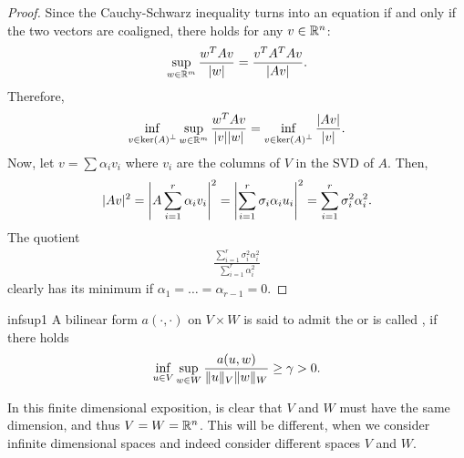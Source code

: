 \begin{proof}
  Since the Cauchy-Schwarz inequality turns into an equation if and
  only if the two vectors are coaligned, there holds for any $v\in \R^n$:
  \begin{gather*}
    \sup_{w\in\R^m}\frac{w^T A v}{\abs{w}} = \frac{v^T A^T A v}{\abs{Av}}.
  \end{gather*}
  Therefore,
  \begin{gather*}
    \inf_{v\in \ortho{\ker A}} \sup_{w\in \R^m}
    \frac{w^T A v}{\abs{v}\abs{w}}
    = \inf_{v\in \ortho{\ker A}} \frac{\abs{Av}}{\abs{v}}.
  \end{gather*}
  Now, let $v = \sum \alpha_i v_i$ where $v_i$ are the columns of $V$
  in the SVD of $A$. Then,
  \begin{gather*}
    \abs{Av}^2 = \abs*{A\sum_{i=1}^r \alpha_i v_i}^2
    = \abs*{\sum_{i=1}^r \sigma_i \alpha_i u_i}^2
    = \sum_{i=1}^r \sigma_i^2 \alpha_i^2.
  \end{gather*}
  The quotient
  \begin{gather*}
    \frac{\sum_{i=1}^r \sigma_i^2 \alpha_i^2}{\sum_{i=1}^r \alpha_i^2}
  \end{gather*}
  clearly has its minimum if $\alpha_1 = \dots=\alpha_{r-1} = 0$.
\end{proof}

\begin{Definition}{infsup1}
  A bilinear form $a(\cdot,\cdot)$ on $V\times W$ is said to admit the
   or is called , if
  there holds
  \begin{gather}
    \label{eq:infsup:1}
    \inf_{u\in V} \sup_{w\in W} \frac{a(u,w)}{\norm{u}_V\norm{w}_W}
    \ge \ellipa > 0.
  \end{gather}
\end{Definition}

\begin{remark}
  In this finite dimensional exposition, is clear that $V$ and $W$
  must have the same dimension, and thus $V=W=\R^n$. This will be
  different, when we consider infinite dimensional spaces and indeed
  consider different spaces $V$ and $W$.
\end{remark}

